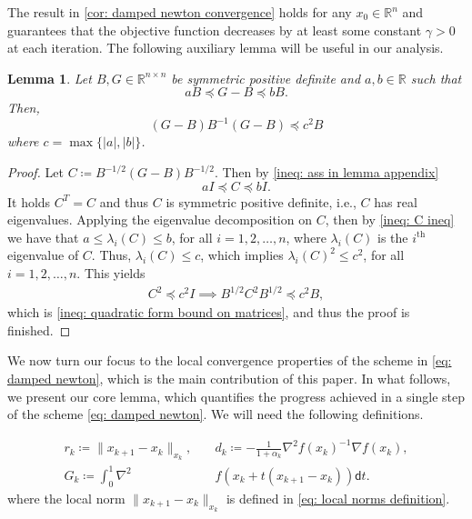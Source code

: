 \documentclass[sn-mathphys-num]{sn-jnl}%
\newcommand{\R}{\mathbb{R}}
\renewcommand{\d}{\mathsf{d}}
\theoremstyle{thmstyleone}%
\newtheorem{lemma}{Lemma}[section]
\theoremstyle{thmstyletwo}%
\theoremstyle{thmstylethree}%
\numberwithin{equation}{section}
\begin{document}
The result in \cref{cor: damped newton convergence} holds for any \(x_0 \in \mathbb{R}^n\) and guarantees that the objective function decreases by at least some constant \(\gamma > 0\) at each iteration. The following auxiliary lemma will be useful in our analysis.
\begin{lemma} \label{lemma: quadratic form bound on matrices}
Let $B, G \in \R^{n \times n}$ be symmetric positive definite and $a, b \in \R$ such that
\begin{equation} \label{ineq: ass in lemma appendix}
     a B \preceq G - B \preceq b B.
\end{equation}
Then,
\begin{equation} \label{ineq: quadratic form bound on matrices}
    \left( G - B\right) B^{-1} \left( G - B\right) \preceq c^2 B
\end{equation}
where $c = \max\{|a|, |b| \}$.
\end{lemma}
\begin{proof}
Let $C \coloneq B^{-1/2} \left( G - B\right) B^{-1/2}$. Then by \eqref{ineq: ass in lemma appendix}
    \begin{equation} \label{ineq: C ineq}
        a I \preceq C \preceq b I.
    \end{equation}
    It holds $C^T = C$ and thus $C$ is symmetric positive definite, i.e., $C$ has real eigenvalues. Applying the eigenvalue decomposition on $C$, then by \eqref{ineq: C ineq} we have that $a \leq \lambda_i(C) \leq b$, for all $i = 1,2, \ldots, n$,  where $\lambda_i(C)$ is the $i^\text{th}$ eigenvalue of $C$. Thus, $\lambda_i(C) \leq c$, which implies $\lambda_i(C)^{2} \leq c^2$, for all  $i = 1,2, \ldots, n$. This yields
    \begin{align*}
        C^2 \preceq c^2 I \implies  B^{1/2}C^2 B^{1/2}\preceq c^2 B,  
    \end{align*}
    which is \eqref{ineq: quadratic form bound on matrices}, and thus the proof is finished.
\end{proof}    

We now turn our focus to the local convergence properties of the scheme in \eqref{eq: damped newton}, which is the main contribution of this paper. In what follows, we present our core lemma, which quantifies the progress achieved in a single step of the scheme \eqref{eq: damped newton}. We will need the following definitions.

\begin{equation} \label{eq: def r_k, d_k}
\begin{split}
    r_k \coloneq \|x_{k+1} - x_{k} \|_{x_{k}}, \quad & d_k \coloneq - \frac{1}{1+ \alpha_k} \nabla^2 f(x_{k})^{-1} \nabla f(x_{k}), \\ 
    G_k \coloneq \int_0^1 \nabla^2 & f (x_k  + t (x_{k+1} - x_k)) \d t.
\end{split}
\end{equation}
where the local norm $\|x_{k+1} - x_{k} \|_{x_{k}}$ is defined in \eqref{eq: local norms definition}.
\end{document}
